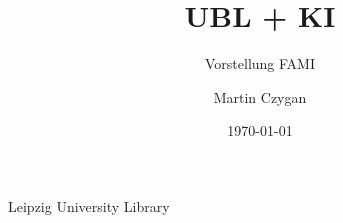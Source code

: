 \title[UBL + KI]{UBL + KI}
\subtitle[Anwendungsfälle in Bibliotheken]{Vorstellung FAMI}
\author{Martin Czygan}
\institute
{Leipzig University Library}
\date{\today}


